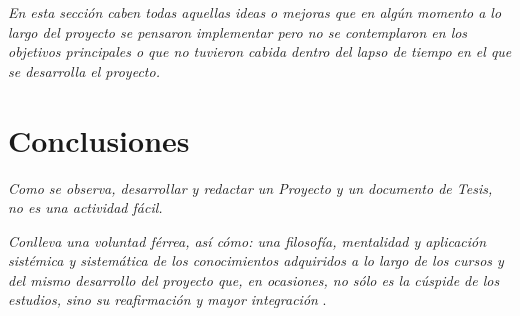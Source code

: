 \textit{En esta sección caben todas aquellas ideas o mejoras que en algún momento a lo largo del proyecto se pensaron implementar pero no se contemplaron en los objetivos principales o que no tuvieron cabida dentro del lapso de tiempo en el que se desarrolla el proyecto.} 


\section{ Conclusiones }

\textit{Como se observa, desarrollar y redactar un Proyecto y un documento de Tesis, no es una actividad fácil.}

\textit{Conlleva una voluntad férrea, así cómo: una filosofía, mentalidad y aplicación sistémica y sistemática de los conocimientos adquiridos a lo largo de los cursos y del mismo desarrollo del proyecto que, en ocasiones, no sólo es la cúspide de los estudios, sino su reafirmación y mayor integración} \cite{Leopoldo}.





